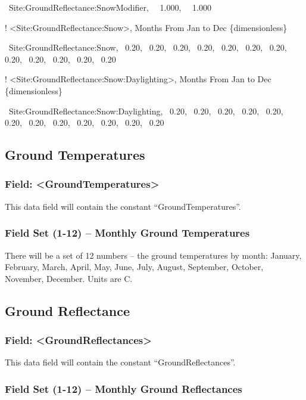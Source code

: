 ~Site:GroundReflectance:SnowModifier,~~ 1.000,~~ 1.000

! \textless{}Site:GroundReflectance:Snow\textgreater{}, Months From Jan to Dec \{dimensionless\}

~Site:GroundReflectance:Snow,~ 0.20,~ 0.20,~ 0.20,~ 0.20,~ 0.20,~ 0.20,~ 0.20,~ 0.20,~ 0.20,~ 0.20,~ 0.20,~ 0.20

! \textless{}Site:GroundReflectance:Snow:Daylighting\textgreater{}, Months From Jan to Dec \{dimensionless\}

~Site:GroundReflectance:Snow:Daylighting,~ 0.20,~ 0.20,~ 0.20,~ 0.20,~ 0.20,~ 0.20,~ 0.20,~ 0.20,~ 0.20,~ 0.20,~ 0.20,~ 0.20

\subsection{Ground Temperatures}\label{ground-temperatures}

\subsubsection{Field: \textless{}GroundTemperatures\textgreater{}}\label{field-groundtemperatures}

This data field will contain the constant ``GroundTemperatures''.

\subsubsection{Field Set (1-12) -- Monthly Ground Temperatures}\label{field-set-1-12-monthly-ground-temperatures}

There will be a set of 12 numbers -- the ground temperatures by month: January, February, March, April, May, June, July, August, September, October, November, December. Units are C.

\subsection{Ground Reflectance}\label{ground-reflectance}

\subsubsection{Field: \textless{}GroundReflectances\textgreater{}}\label{field-groundreflectances}

This data field will contain the constant ``GroundReflectances''.

\subsubsection{Field Set (1-12) -- Monthly Ground Reflectances}\label{field-set-1-12-monthly-ground-reflectances}


